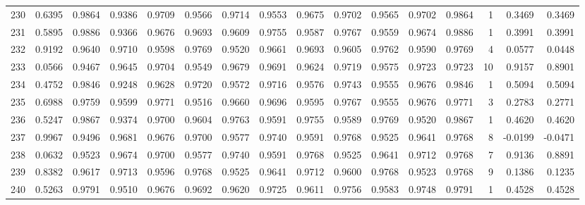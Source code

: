 \begin{tabular}{lrrrrrrrrrrrrrrr}
230 &      0.6395 &  0.9864 &  0.9386 &  0.9709 &  0.9566 &  0.9714 &  0.9553 &  0.9675 &  0.9702 &  0.9565 &   0.9702 &     0.9864 &      1 &                    0.3469 &                     0.3469 \\
231 &      0.5895 &  0.9886 &  0.9366 &  0.9676 &  0.9693 &  0.9609 &  0.9755 &  0.9587 &  0.9767 &  0.9559 &   0.9674 &     0.9886 &      1 &                    0.3991 &                     0.3991 \\
232 &      0.9192 &  0.9640 &  0.9710 &  0.9598 &  0.9769 &  0.9520 &  0.9661 &  0.9693 &  0.9605 &  0.9762 &   0.9590 &     0.9769 &      4 &                    0.0577 &                     0.0448 \\
233 &      0.0566 &  0.9467 &  0.9645 &  0.9704 &  0.9549 &  0.9679 &  0.9691 &  0.9624 &  0.9719 &  0.9575 &   0.9723 &     0.9723 &     10 &                    0.9157 &                     0.8901 \\
234 &      0.4752 &  0.9846 &  0.9248 &  0.9628 &  0.9720 &  0.9572 &  0.9716 &  0.9576 &  0.9743 &  0.9555 &   0.9676 &     0.9846 &      1 &                    0.5094 &                     0.5094 \\
235 &      0.6988 &  0.9759 &  0.9599 &  0.9771 &  0.9516 &  0.9660 &  0.9696 &  0.9595 &  0.9767 &  0.9555 &   0.9676 &     0.9771 &      3 &                    0.2783 &                     0.2771 \\
236 &      0.5247 &  0.9867 &  0.9374 &  0.9700 &  0.9604 &  0.9763 &  0.9591 &  0.9755 &  0.9589 &  0.9769 &   0.9520 &     0.9867 &      1 &                    0.4620 &                     0.4620 \\
237 &      0.9967 &  0.9496 &  0.9681 &  0.9676 &  0.9700 &  0.9577 &  0.9740 &  0.9591 &  0.9768 &  0.9525 &   0.9641 &     0.9768 &      8 &                   -0.0199 &                    -0.0471 \\
238 &      0.0632 &  0.9523 &  0.9674 &  0.9700 &  0.9577 &  0.9740 &  0.9591 &  0.9768 &  0.9525 &  0.9641 &   0.9712 &     0.9768 &      7 &                    0.9136 &                     0.8891 \\
239 &      0.8382 &  0.9617 &  0.9713 &  0.9596 &  0.9768 &  0.9525 &  0.9641 &  0.9712 &  0.9600 &  0.9768 &   0.9523 &     0.9768 &      9 &                    0.1386 &                     0.1235 \\
240 &      0.5263 &  0.9791 &  0.9510 &  0.9676 &  0.9692 &  0.9620 &  0.9725 &  0.9611 &  0.9756 &  0.9583 &   0.9748 &     0.9791 &      1 &                    0.4528 &                     0.4528 \\

\end{tabular}

